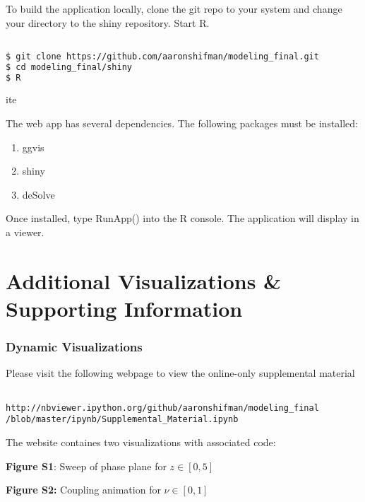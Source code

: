 \documentclass[11pt]{report}
\begin{document}
To build the application locally, clone the git repo to your system and change your directory to the shiny repository. Start R. 

\begin{lstlisting}[language = sh]

$ git clone https://github.com/aaronshifman/modeling_final.git
$ cd modeling_final/shiny 
$ R

\end{lstlisting}ite

The web app has several dependencies. The following packages must be installed:


\begin{enumerate}
  \item ggvis
  \item shiny
  \item deSolve
\end{enumerate}

Once installed, type RunApp() into the R console. The application will display in a viewer.


\section{Additional Visualizations \& Supporting Information} %
\label{sec:web_app}


\subsubsection{Dynamic Visualizations} %
\label{ssub:dynamic_visualizations}

Please visit the following webpage to view the online-only supplemental material

\begin{lstlisting}
  
http://nbviewer.ipython.org/github/aaronshifman/modeling_final
/blob/master/ipynb/Supplemental_Material.ipynb

\end{lstlisting}


The website containes two visualizations with associated code:

\textbf{Figure S1}: Sweep of phase plane for $z \in [0,5]$

\textbf{Figure S2:} Coupling animation for $\nu \in [0,1]$

\end{document}
